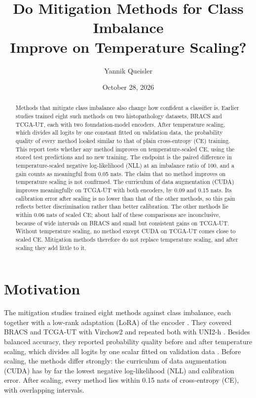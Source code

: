 \documentclass[11pt]{article}
\title{Do Mitigation Methods for Class Imbalance\\Improve on Temperature Scaling?}
\author{Yannik Queisler}
\date{October 28, 2026}
\begin{document}
\raggedbottom
{}
\setlength{\emergencystretch}{2em}
\maketitle
\begin{abstract}
\noindent Methods that mitigate class imbalance also change how confident a classifier is. Earlier studies trained eight such methods on two histopathology datasets, BRACS and TCGA-UT, each with two foundation-model encoders. After temperature scaling, which divides all logits by one constant fitted on validation data, the probability quality of every method looked similar to that of plain cross-entropy (CE) training. This report tests whether any method improves on temperature-scaled CE, using the stored test predictions and no new training. The endpoint is the paired difference in temperature-scaled negative log-likelihood (NLL) at an imbalance ratio of 100, and a gain counts as meaningful from 0.05 nats. The claim that no method improves on temperature scaling is not confirmed. The curriculum of data augmentation (CUDA) improves meaningfully on TCGA-UT with both encoders, by 0.09 and 0.15 nats. Its calibration error after scaling is no lower than that of the other methods, so this gain reflects better discrimination rather than better calibration. The other methods lie within 0.06 nats of scaled CE; about half of these comparisons are inconclusive, because of wide intervals on BRACS and small but consistent gains on TCGA-UT. Without temperature scaling, no method except CUDA on TCGA-UT comes close to scaled CE. Mitigation methods therefore do not replace temperature scaling, and after scaling they add little to it.
\end{abstract}

\section{Motivation}
\label{sec:motivation}
The mitigation studies trained eight methods against class imbalance, each together with a low-rank adaptation (LoRA) of the encoder \citep{queisler2026mitigationMethods}. They covered BRACS and TCGA-UT with Virchow2 \citep{zimmermann2024virchow2,queisler2026mitigationBracs,queisler2026mitigationTcga} and repeated both with UNI2-h \citep{mahmoodlab2025uni2h,queisler2026mitigationUni2h,queisler2026mitigationTcgaUni2h}. Besides balanced accuracy, they reported probability quality before and after temperature scaling, which divides all logits by one scalar fitted on validation data \citep{guo2017calibration}. Before scaling, the methods differ strongly: the curriculum of data augmentation (CUDA) \citep{ahn2023cuda} has by far the lowest negative log-likelihood (NLL) and calibration error. After scaling, every method lies within 0.15 nats of cross-entropy (CE), with overlapping intervals.
\end{document}
